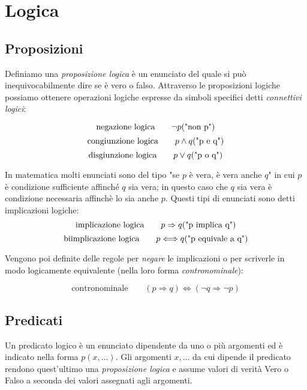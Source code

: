 \documentclass[x11names]{article}
\begin{document}
\newpage
\section{Logica}
\subsection{Proposizioni}
Definiamo una \textit{proposizione logica} è un enunciato del quale si può inequivocabilmente dire  se  è vero o falso. Attraverso le proposizioni logiche possiamo ottenere operazioni logiche espresse da simboli specifici detti \textit{connettivi logici}: 

\[
\text{negazione logica}\qquad    \neg p \text{("non p")}\\ \\
\]
\[
\text{congiunzione logica}\qquad   p \wedge q  \text{("p e q")}\\ 
\]
\[
\text{disgiunzione logica}\qquad   p \vee q  \text{("p o q")}\\ 
\]

\vspace{0.7em}
\noindent
In matematica molti enunciati sono del tipo "se $p$ è vera, è vera anche $q$" in cui $p$ è condizione sufficiente affinché $q$ sia vera; in questo caso che $q$ sia vera è condizione necessaria affinchè lo sia anche $p$. Questi tipi di enunciati sono detti implicazioni logiche:
\[
\text{implicazione logica}\qquad   p \Rightarrow q  \text{("p implica q")}\\ 
\]
\[
\text{biimplicazione logica}\qquad   p \Longleftrightarrow q  \text{("p equivale a q")}\\ 
\]

\vspace{0.7em}
\noindent
Vengono poi definite delle regole per \textit{negare} le implicazioni o per scriverle in modo logicamente equivalente (nella loro forma \textit{contronominale}):

\[
\text{contronominale}\qquad   (p \Rightarrow q) \Longleftrightarrow (\neg q \Rightarrow \neg p)  
\]

\subsection{Predicati}
Un predicato logico è un enunciato dipendente da uno o più argomenti ed è indicato nella forma $p(x,\dots)$. Gli argomenti $x,\dots$ da cui dipende il predicato rendono quest'ultimo una \textit{proposizione logica} e assume valori di verità Vero o Falso a seconda dei valori assegnati agli argomenti.
\end{document}
